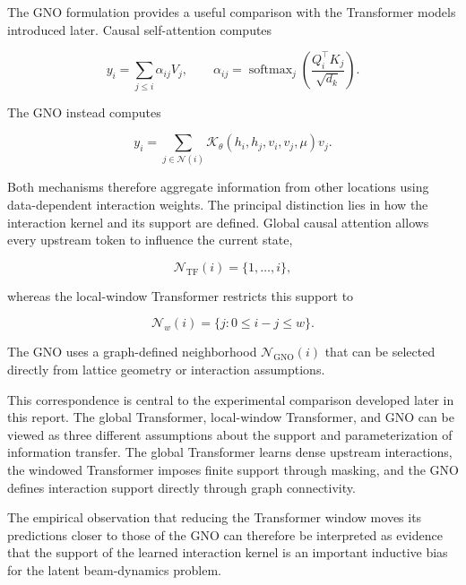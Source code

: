 The GNO formulation provides a useful comparison with the Transformer models introduced later\cite{wang2026latent}. Causal self-attention computes

\begin{equation}
\label{eq:129}
y_i=\sum_{j\le i}\alpha_{ij}V_j,\qquad\alpha_{ij}=\operatorname{softmax}_j\left(\frac{Q_i^{\top}K_j}{\sqrt{d_k}}\right).
\end{equation}

The GNO instead computes

\begin{equation}
\label{eq:130}
y_i=\sum_{j\in\mathcal N(i)}\mathcal K_{\theta}(h_i,h_j,v_i,v_j,\mu)v_j.
\end{equation}

Both mechanisms therefore aggregate information from other locations using data-dependent interaction weights. The principal distinction lies in how the interaction kernel and its support are defined. Global causal attention allows every upstream token to influence the current state,

\begin{equation}
\label{eq:131}
\mathcal N_{\mathrm{TF}}(i)=\{1,\ldots,i\},
\end{equation}

whereas the local-window Transformer restricts this support to

\begin{equation}
\label{eq:132}
\mathcal N_w(i)=\{j:0\le i-j\le w\}.
\end{equation}

The GNO uses a graph-defined neighborhood \(\mathcal{N}_{\mathrm{GNO}} ( i )\) that can be selected directly from lattice geometry or interaction assumptions.

This correspondence is central to the experimental comparison developed later in this report. The global Transformer, local-window Transformer, and GNO can be viewed as three different assumptions about the support and parameterization of information transfer. The global Transformer learns dense upstream interactions, the windowed Transformer imposes finite support through masking, and the GNO defines interaction support directly through graph connectivity.

The empirical observation that reducing the Transformer window moves its predictions closer to those of the GNO can therefore be interpreted as evidence that the support of the learned interaction kernel is an important inductive bias for the latent beam-dynamics problem.

